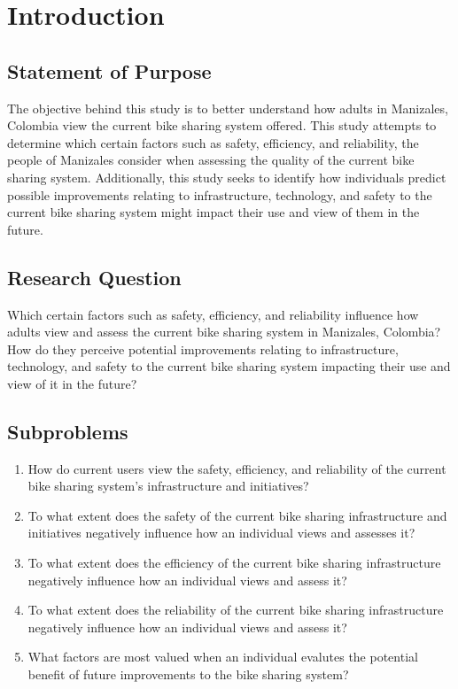 \documentclass[12pt]{article}
\begin{document}
\section*{Introduction}

\subsection*{Statement of Purpose}
The objective behind this study is to better understand how adults in Manizales, Colombia view the current bike sharing system offered.
This study attempts to determine which certain factors such as safety, efficiency, and reliability,
the people of Manizales consider when assessing the quality of the current bike sharing system. Additionally, this study seeks to identify how individuals predict
possible improvements relating to infrastructure, technology, and safety to the current bike sharing system might 
impact their use and view of them in the future.
\subsection*{Research Question}
Which certain factors such as safety, efficiency, and reliability influence how 
adults view and assess the current bike sharing system in Manizales, Colombia? 
How do they perceive potential improvements relating to infrastructure, technology, and safety
to the current bike sharing system impacting their use and view of it in the future?

\subsection*{Subproblems}
\begin{enumerate}
    \item How do current users view the safety, efficiency, and reliability of the current bike sharing system's infrastructure and initiatives?
    \item To what extent does the safety of the current bike sharing infrastructure and initiatives negatively influence how an
    individual views and assesses it?
    \item To what extent does the efficiency of the current bike sharing infrastructure negatively influence how an
    individual views and assess it?
    \item To what extent does the reliability of the current bike sharing infrastructure negatively influence how an
    individual views and assess it?
    \item What factors are most valued when an individual evalutes the potential benefit of future improvements to the bike sharing system?
\end{enumerate}
\end{document}
